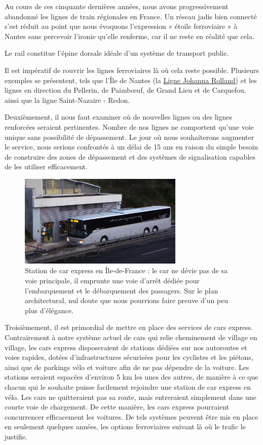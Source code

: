 Au cours de ces cinquante dernières années, nous avons progressivement
abandonné les lignes de train régionales en France. Un réseau jadis
bien connecté s'est réduit au point que nous évoquons l'expression «
étoile ferroviaire » à Nantes sans percevoir l'ironie qu'elle
renferme, car il ne reste en réalité que cela.

Le rail constitue l'épine dorsale idéale d'un système de transport
public.

Il est impératif de rouvrir les lignes ferroviaires là où cela reste
possible. Plusieurs exemples se présentent, tels que l'Île de Nantes
(la
\href{https://www.mobilitains.fr/tb/t/ligne-johanna-rolland-2021/}{Ligne
  Johanna Rolland}) et les lignes en direction du Pellerin, de
Paimbœuf, de Grand Lieu et de Carquefou, ainsi que la ligne
Saint-Nazaire - Redon.

Deuxièmement, il nous faut examiner où de nouvelles lignes ou des
lignes renforcées seraient pertinentes. Nombre de nos lignes ne
comportent qu'une voie unique sans possibilité de dépassement. Le jour
où nous souhaiterons augmenter le service, nous serions confrontés à
un délai de 15 ans en raison du simple besoin de construire des zones
de dépassement et des systèmes de signalisation capables de les
utiliser efficacement.

\begin{figure}[ht]
  \centering
  \includegraphics[width=0.7\textwidth]{images/car-express.jpg}
  \caption{Station de car express en Île-de-France : le car ne dévie
    pas de sa voie principale, il emprunte une voie d'arrêt dédiée
    pour l'embarquement et le débarquement des passagers. Sur le plan
    architectural, nul doute que nous pourrions faire preuve d'un peu
    plus d'élégance.}
  \label{fig:car-express}
\end{figure}

Troisièmement, il est primordial de mettre en place des services de
cars express. Contrairement à notre système actuel de cars qui relie
cheminement de village en village, les cars express disposeraient de
stations dédiées sur nos autoroutes et voies rapides, dotées
d'infrastructures sécurisées pour les cyclistes et les piétons, ainsi
que de parkings vélo et voiture afin de ne pas dépendre de la
voiture. Les stations seraient espacées d'environ 5 km les unes des
autres, de manière à ce que chacun qui le souhaite puisse facilement
rejoindre une station de car express en vélo. Les cars ne quitteraient
pas sa route, mais entreraient simplement dans une courte voie de
chargement. De cette manière, les cars express pourraient concurrencer
efficacement les voitures. De tels systèmes peuvent être mis en place
en seulement quelques années, les options ferroviaires suivant là où
le trafic le justifie.

